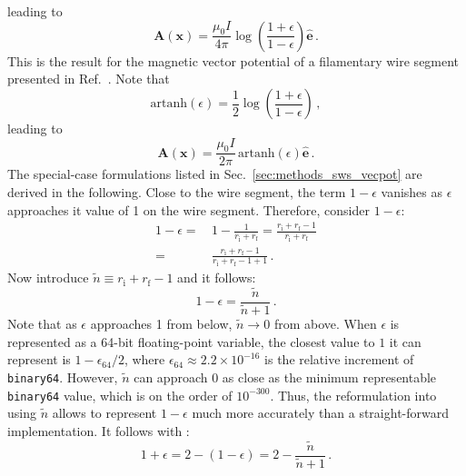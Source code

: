 leading to
\begin{equation}
 \mathbf{A}(\mathbf{x}) = \frac{\mu_0 I}{4 \pi} \log\left(\frac{1 + \epsilon}{1 - \epsilon} \right) \hat{\mathbf{e}} \, . \label{eqn:A_log_eps}
\end{equation}
This is the result for the magnetic vector potential of a filamentary wire segment presented in Ref.~\cite{hanson_hirshman_2002}.
Note that
\begin{equation}
 \mathrm{artanh}\left( \epsilon \right) = \frac{1}{2} \log\left(\frac{1 + \epsilon}{1 - \epsilon} \right) \, ,
\end{equation}
leading to
\begin{equation}
 \mathbf{A}(\mathbf{x}) = \frac{\mu_0 I}{2 \pi} \, \mathrm{artanh} \left( \epsilon \right) \hat{\mathbf{e}} \, . \label{eqn:A_artanh}
\end{equation}
The special-case formulations listed in Sec.~\ref{sec:methods_sws_vecpot} are derived in the following.
Close to the wire segment, the term $1-\epsilon$ vanishes as $\epsilon$ approaches it value of 1 on the wire segment.
Therefore, consider $1-\epsilon$:
\begin{align}
  1 - \epsilon
  =&\, 1 - \frac{1}{r_\mathrm{i} + r_\mathrm{f}} = \frac{r_\mathrm{i} + r_\mathrm{f} - 1}{r_\mathrm{i} + r_\mathrm{f}} \nonumber \\
  =&\, \frac{r_\mathrm{i} + r_\mathrm{f} - 1}{r_\mathrm{i} + r_\mathrm{f} - 1 + 1} \, .
\end{align}
Now introduce $\tilde{n} \equiv r_\mathrm{i} + r_\mathrm{f} - 1$ and it follows:
\begin{equation}
  1 - \epsilon = \frac{\tilde{n}}{\tilde{n}+1} \label{eqn:omeps} \, .
\end{equation}
Note that as $\epsilon$ approaches 1 from below, $\tilde{n} \rightarrow 0$ from above.
When $\epsilon$ is represented as a 64-bit floating-point variable, the closest value to $1$ it can represent is $1-\epsilon_{64}/2$,
where $\epsilon_{64} \approx 2.2 \times 10^{-16}$ is the relative increment of \texttt{binary64}.
However, $\tilde{n}$ can approach 0 as close as the minimum representable \texttt{binary64} value, which is on the order of $10^{-300}$.
Thus, the reformulation into using $\tilde{n}$ allows to represent $1-\epsilon$ much more accurately than a straight-forward implementation.
It follows with :
\begin{equation}
  1 + \epsilon = 2 - (1 - \epsilon) = 2 - \frac{\tilde{n}}{\tilde{n}+1} \label{eqn:opeps} \, .
\end{equation}
